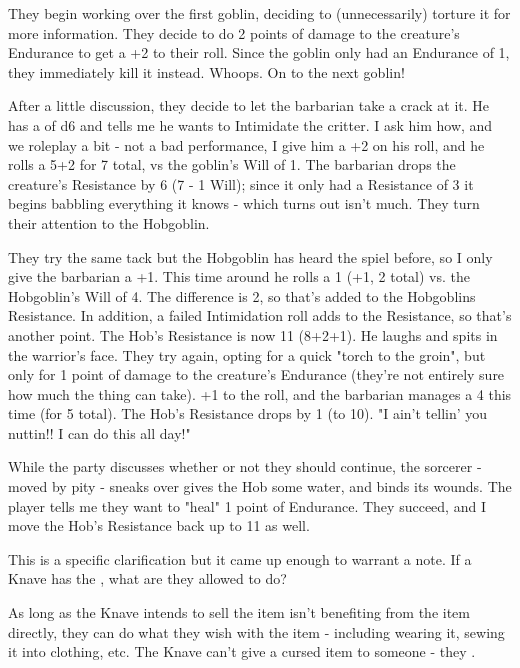 {{\myskip

    They begin working over the first goblin, deciding to (unnecessarily) torture it for more information. They decide to do 2 points of damage to the creature's Endurance to get a +2 to their roll.  Since the goblin only had an Endurance of 1, they immediately kill it instead.  Whoops. On to the next goblin!

\myskip

    After a little discussion, they decide to let the barbarian take a crack at it. He has a \PRE of d6 and tells me he wants to Intimidate the critter. I ask him how, and we roleplay a bit - not a bad performance, I give him a +2 on his roll, and he rolls a 5+2 for 7 total, vs the goblin's Will of 1. The barbarian drops the creature's Resistance by 6 (7 - 1 Will); since it only had a Resistance of 3 it begins babbling everything it knows - which turns out isn't much.  They turn their attention to the Hobgoblin.

\myskip

    They try the same tack but the Hobgoblin has heard the spiel before, so I only give the barbarian a +1.  This time around he rolls a 1 (+1, 2 total) vs. the Hobgoblin's Will of 4. The difference is 2, so that's added to the Hobgoblins Resistance. In addition, a failed Intimidation roll adds to the Resistance, so that's another point. The Hob's Resistance is now 11 (8+2+1). He laughs and spits in the warrior's face. They try again, opting for a quick "torch to the groin", but only for 1 point of damage to the creature's Endurance (they're not entirely sure how much the thing can take). +1 to the roll, and the barbarian manages a 4 this time (for 5 total). The Hob's Resistance drops by 1 (to 10).  "I ain't tellin' you nuttin!! I can do this all day!"

\myskip

    While the party discusses whether or not they should continue, the sorcerer - moved by pity - sneaks over gives the Hob some water, and binds its wounds. The player tells me they want to "heal" 1 point of Endurance. They succeed, and I move the Hob's Resistance back up to 11 as well. 
}



This is a specific clarification but it came up enough to warrant a note. If a Knave has the , what are they allowed to do?

As long as the Knave intends to sell the item  isn't benefiting from the item directly, they can do what they wish with the item - including wearing it, sewing it into clothing, etc.  The Knave can't give a cursed item to someone - they .

}
